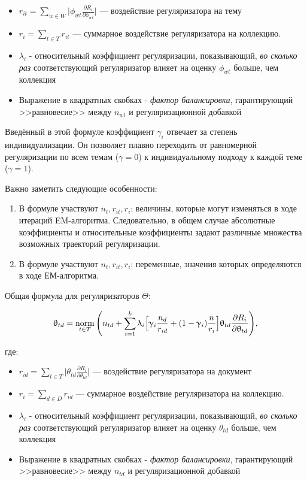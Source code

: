 \begin{itemize}
    \item{$r_{it} = \sum_{w\in W} \Big| \phi_{wt} \frac{\partial R_i}{\partial \phi_{wt}} \Big| $ --- воздействие регуляризатора на тему}
    \item { $r_{i} = \sum_{t\in T} r_{it}$ --- суммарное воздействие регуляризатора на коллекцию.}
    \item { $\lambda_i$ - относительный коэффициент регуляризации, показывающий, \emph{во сколько раз} соответствующий регуляризатор влияет на оценку $\phi_{wt}$ больше, чем коллекция}
    \item {Выражение в квадратных скобках - \textit{фактор балансировки}, гарантирующий >>равновесие>> между $n_{wt}$ и регуляризационной добавкой}
\end{itemize}

Введённый в этой формуле коэффициент $\gamma_i$ отвечает за степень индивидуализации. Он позволяет плавно переходить от равномерной регуляризации по всем темам ($\gamma = 0$) к индивидуальному подходу к каждой теме ($\gamma = 1$).

Важно заметить следующие особенности:

\begin{enumerate}
    \item {В формуле участвуют $n_t, r_{it}, r_{i}$:  величины, которые могут изменяться в ходе итераций EM-алгоритма. Следовательно, в общем случае абсолютные коэффициенты и относительные  коэффициенты задают различные множества возможных траекторий регуляризации.}
    \item  {В формуле участвуют $n_t, r_{it}, r_{i}$: переменные, значения которых определяются в ходе ЕМ-алгоритма.}
\end{enumerate}

Общая формула для регуляризаторов $\Theta$:

\[
\uptheta_{td} = \mathop{\mathrm{norm}}\limits_{t \in T} \Bigg(
    n_{td} + \sum_{i=1}^k \uplambda_i \Big[
        \upgamma_i \frac{n_d}{r_{id}} + (1-\upgamma_i)\frac{n}{r_i}
        \Big]
    \uptheta_{td} \frac{\partial R_i}{\partial \uptheta_{td}}
\Bigg), \label{rel_theta_general}
\]

где:

\begin{itemize}
    \item { $r_{id} = \sum_{t\in T} \Big | \theta_{td} \frac{\partial R_i}{\partial \theta_{td}} \Big | $ --- воздействие регуляризатора на документ}
    \item { $r_{i} = \sum_{d\in D} r_{id}$ --- суммарное воздействие регуляризатора на коллекцию.}
    \item { $\lambda_i$ - относительный коэффициент регуляризации, показывающий, \emph{во сколько раз} соответствующий регуляризатор влияет на оценку $\theta_{td}$ больше, чем коллекция}
    \item {Выражение в квадратных скобках - \textit{фактор балансировки}, гарантирующий >>равновесие>> между $n_{td}$ и регуляризационной добавкой}
\end{itemize}


